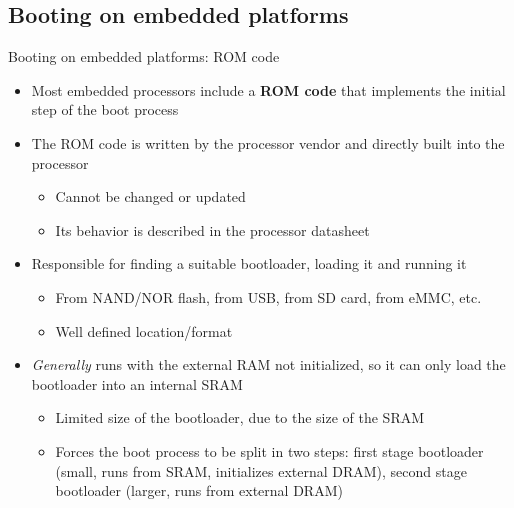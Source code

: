 \subsection{Booting on embedded platforms}

\begin{frame}{Booting on embedded platforms: ROM code}
  \begin{itemize}
  \item Most embedded processors include a {\bf ROM code} that
    implements the initial step of the boot process
  \item The ROM code is written by the processor vendor and directly
    built into the processor
    \begin{itemize}
    \item Cannot be changed or updated
    \item Its behavior is described in the processor datasheet
    \end{itemize}
  \item Responsible for finding a suitable bootloader, loading it and
    running it
    \begin{itemize}
    \item From NAND/NOR flash, from USB, from SD card, from eMMC, etc.
    \item Well defined location/format
    \end{itemize}
  \item {\em Generally} runs with the external RAM not initialized, so
    it can only load the bootloader into an internal SRAM
    \begin{itemize}
    \item Limited size of the bootloader, due to the size of the SRAM
    \item Forces the boot process to be split in two steps: first
      stage bootloader (small, runs from SRAM, initializes external DRAM),
      second stage bootloader (larger, runs from external DRAM)
    \end{itemize}
  \end{itemize}
\end{frame}

